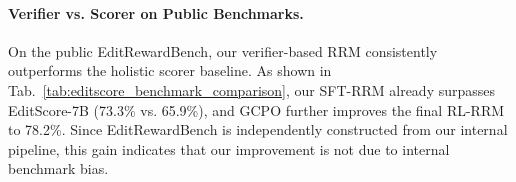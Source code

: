 \paragraph{Verifier vs. Scorer on Public Benchmarks.}
On the public EditRewardBench, our verifier-based RRM consistently outperforms the holistic scorer baseline. As shown in Tab.~\ref{tab:editscore_benchmark_comparison}, our SFT-RRM already surpasses EditScore-7B (73.3\% vs. 65.9\%), and GCPO further improves the final RL-RRM to 78.2\%. Since EditRewardBench is independently constructed from our internal pipeline, this gain indicates that our improvement is not due to internal benchmark bias. 
\vspace{-1.2em}

